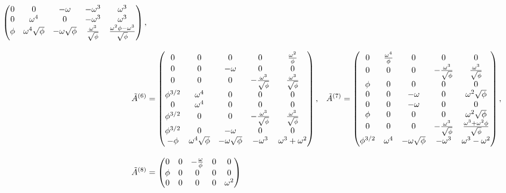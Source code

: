 \begin{align}
\begin{pmatrix}
    0 & 0 & -\omega & -\omega^3 & \omega^3 \\
    0 & \omega^4 & 0 & -\omega^3 & \omega^3 \\
    \phi & \omega^4 \sqrt{\phi} & -\omega\sqrt{\phi} & \frac{\omega^3}{\sqrt{\phi}} & \frac{\omega^2 \phi-\omega^3}{\sqrt{\phi}} \\
  \end{pmatrix}, \notag \\[2ex]
  \tilde{A}^{(6)} &= \begin{pmatrix}
    0 & 0 & 0 & 0 & \frac{\omega^2}{\phi} \\
    0 & 0 & -\omega & 0 & 0 \\
    0 & 0 & 0 & -\frac{\omega^3}{\sqrt{\phi}} & \frac{\omega^3}{\sqrt{\phi}} \\
    \phi^{3/2} & \omega^4 & 0 & 0 & 0 \\
    0 & \omega^4 & 0 & 0 & 0 \\
    \phi^{3/2} & 0 & 0 & -\frac{\omega^3}{\sqrt{\phi}} & \frac{\omega^3}{\sqrt{\phi}} \\
    \phi^{3/2} & 0 & -\omega & 0 & 0 \\
    -\phi & \omega^4 \sqrt{\phi} & -\omega\sqrt{\phi} & -\omega^3 & \omega^3+\omega^2 \\
  \end{pmatrix}, &
  \tilde{A}^{(7)} &= \begin{pmatrix}
    0 & \frac{\omega^4}{\phi} & 0 & 0 & 0 \\
    0 & 0 & 0 & -\frac{\omega^3}{\sqrt{\phi}} & \frac{\omega^3}{\sqrt{\phi}} \\
    \phi & 0 & 0 & 0 & 0 \\
    0 & 0 & -\omega & 0 & \omega^2 \sqrt{\phi} \\
    0 & 0 & -\omega & 0 & 0 \\
    \phi & 0 & 0 & 0 & \omega^2 \sqrt{\phi} \\
    0 & 0 & 0 & -\frac{\omega^3}{\sqrt{\phi}} & \frac{\omega^3+\omega^2 \phi}{\sqrt{\phi}} \\
    \phi^{3/2} & \omega^4 & -\omega\sqrt{\phi} & -\omega^3 & \omega^3-\omega^2 \\
  \end{pmatrix}, \notag \\[2ex]
  \tilde{A}^{(8)} &= \begin{pmatrix}
    0 & 0 & -\frac{\omega}{\phi} & 0 & 0 \\
    \phi & 0 & 0 & 0 & 0 \\
    0 & 0 & 0 & 0 & \omega^2 \\

\end{pmatrix}
\end{align}
